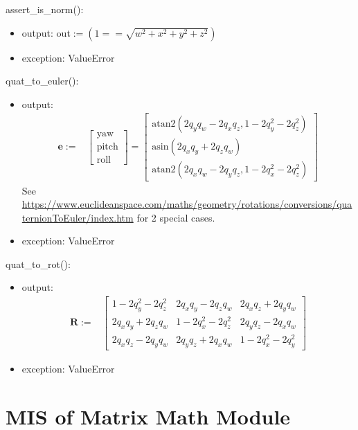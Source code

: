 \documentclass[12pt, titlepage]{article}
\begin{document}
\noindent assert\_is\_norm():
\begin{itemize}
\item output: out$:= (1 == \sqrt{w^2 + x^2 + y^2 + z^2})$
\item exception: ValueError
\end{itemize}

\noindent quat\_to\_euler():
\begin{itemize}
\item output: \begin{align*}
  \mathbf{e} :=& \begin{bmatrix}
    \text{yaw} \\ \text{pitch} \\ \text{roll}
  \end{bmatrix} =
  \begin{bmatrix}
    \text{atan2}(2 q_y q_w - 2 q_x q_z, 1 - 2 q_y^2 - 2 q_z ^ 2) \\
    \text{asin}(2 q_x q_y + 2 q_z q_w) \\
    \text{atan2}(2 q_x q_w - 2 q_y q_z, 1 - 2 q_x^2 - 2 q_z ^2)
  \end{bmatrix}
\end{align*}
See \url{https://www.euclideanspace.com/maths/geometry/rotations/conversions/quaternionToEuler/index.htm} for 2 special cases.
\item exception: ValueError
\end{itemize}

\noindent quat\_to\_rot():
\begin{itemize}
\item output: \begin{align*}
  \mathbf{R}:= & \begin{bmatrix}
    1- 2 q_y^2 - 2 q_z^2 & 2 q_x q_y - 2 q_z q_w & 2 q_x q_z + 2 q_y q_w \\
    2 q_x q_y + 2 q_z q_w & 1 -2 q_x^2 - 2 q_z^2 & 2 q_y q_z - 2 q_x q_w \\
    2 q_x q_z - 2 q_y q_w & 2 q_y q_z + 2 q_x q_w & 1 -2 q_x^2 - 2 q_y ^2
  \end{bmatrix}
\end{align*}
\item exception: ValueError
\end{itemize}

\newpage

\section{MIS of Matrix Math Module} \label{mmm}
\end{document}
